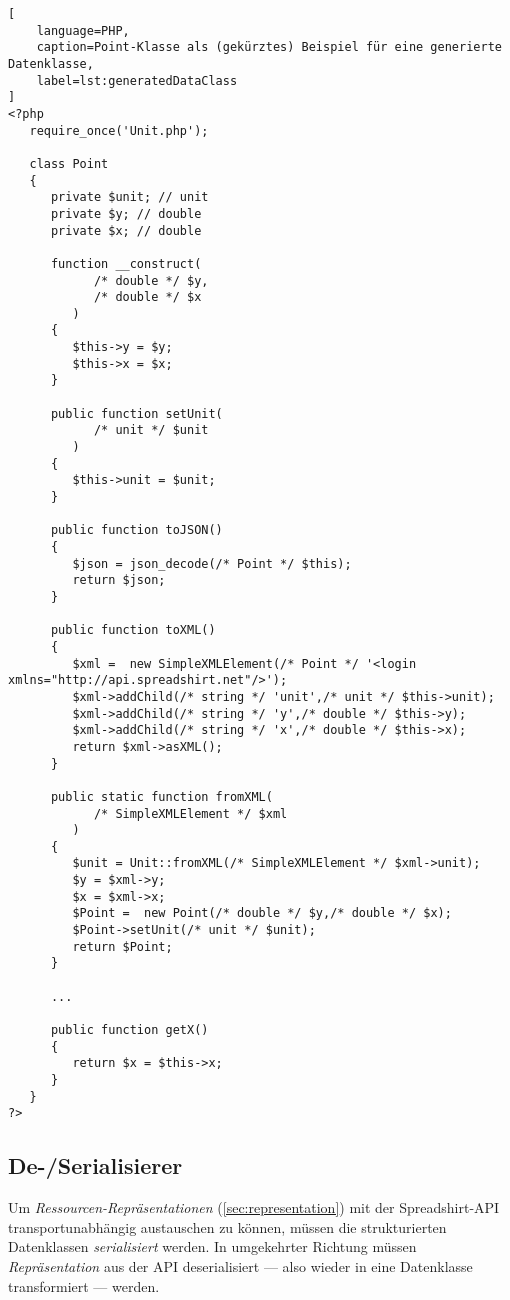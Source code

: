 \begin{lstlisting}[
    language=PHP,
    caption=Point-Klasse als (gekürztes) Beispiel für eine generierte Datenklasse,
    label=lst:generatedDataClass
]
<?php
   require_once('Unit.php');

   class Point
   {
      private $unit; // unit 
      private $y; // double 
      private $x; // double 

      function __construct(
            /* double */ $y,
            /* double */ $x
         )
      {
         $this->y = $y;
         $this->x = $x;
      }

      public function setUnit(
            /* unit */ $unit
         )
      {
         $this->unit = $unit;
      }

      public function toJSON()
      {
         $json = json_decode(/* Point */ $this);
         return $json;
      }

      public function toXML()
      {
         $xml =  new SimpleXMLElement(/* Point */ '<login xmlns="http://api.spreadshirt.net"/>');
         $xml->addChild(/* string */ 'unit',/* unit */ $this->unit);
         $xml->addChild(/* string */ 'y',/* double */ $this->y);
         $xml->addChild(/* string */ 'x',/* double */ $this->x);
         return $xml->asXML();
      }

      public static function fromXML(
            /* SimpleXMLElement */ $xml
         )
      {
         $unit = Unit::fromXML(/* SimpleXMLElement */ $xml->unit);
         $y = $xml->y;
         $x = $xml->x;
         $Point =  new Point(/* double */ $y,/* double */ $x);
         $Point->setUnit(/* unit */ $unit);
         return $Point;
      }

      ...

      public function getX()
      {
         return $x = $this->x;
      }
   }
?>
\end{lstlisting}

\subsection{De-/Serialisierer}
\label{sec:serialiser}

Um \emph{Ressourcen-Repräsentationen} (\cref{sec:representation}) mit der Spreadshirt-\gls{API} transportunabhängig austauschen zu können, müssen die strukturierten Datenklassen \emph{serialisiert} werden. In umgekehrter Richtung müssen \emph{Repräsentation} aus der \gls{API} deserialisiert --- also wieder in eine Datenklasse transformiert --- werden.

